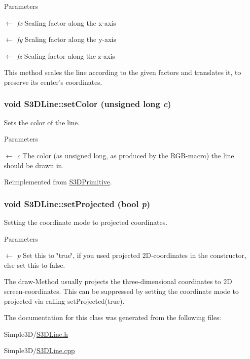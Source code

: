 \begin{DoxyParams}{Parameters}
\item[\mbox{$\leftarrow$} {\em fx}]Scaling factor along the x-\/axis \item[\mbox{$\leftarrow$} {\em fy}]Scaling factor along the y-\/axis \item[\mbox{$\leftarrow$} {\em fz}]Scaling factor along the z-\/axis\end{DoxyParams}
This method scales the line according to the given factors and translates it, to preserve its center's coordinates. \hypertarget{class_s3_d_line_a9feaf056477e858a7b0248a7b5cdd222}{
\subsubsection[{setColor}]{\setlength{\rightskip}{0pt plus 5cm}void S3DLine::setColor (unsigned long {\em c})}}
\label{class_s3_d_line_a9feaf056477e858a7b0248a7b5cdd222}


Sets the color of the line. 


\begin{DoxyParams}{Parameters}
\item[\mbox{$\leftarrow$} {\em c}]The color (as unsigned long, as produced by the RGB-\/macro) the line should be drawn in. \end{DoxyParams}


Reimplemented from \hyperlink{class_s3_d_primitive_a1c8f036193987522bdfb6a49b9b74000}{S3DPrimitive}.

\hypertarget{class_s3_d_line_a3b973e5206d4bed73b797b4c5afe8dec}{
\subsubsection[{setProjected}]{\setlength{\rightskip}{0pt plus 5cm}void S3DLine::setProjected (bool {\em p})}}
\label{class_s3_d_line_a3b973e5206d4bed73b797b4c5afe8dec}


Setting the coordinate mode to projected coordinates. 


\begin{DoxyParams}{Parameters}
\item[\mbox{$\leftarrow$} {\em p}]Set this to \char`\"{}true\char`\"{}, if you used projected 2D-\/coordinates in the constructor, else set this to false.\end{DoxyParams}
The draw-\/Method usually projects the three-\/dimensional coordinates to 2D screen-\/coordinates. This can be suppressed by setting the coordinate mode to projected via calling setProjected(true). 

The documentation for this class was generated from the following files:\begin{DoxyCompactItemize}
\item 
Simple3D/\hyperlink{_s3_d_line_8h}{S3DLine.h}\item 
Simple3D/\hyperlink{_s3_d_line_8cpp}{S3DLine.cpp}\end{DoxyCompactItemize}

